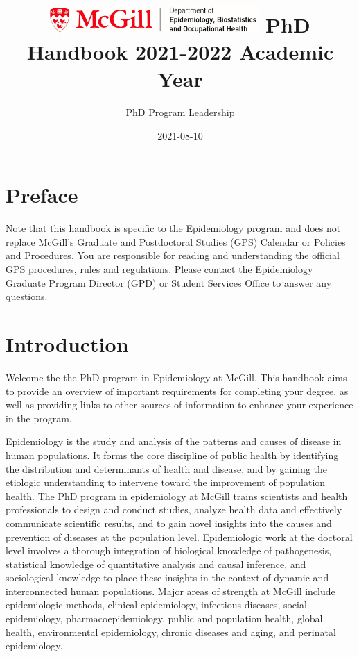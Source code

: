 \documentclass[
]{book}
\title{\includegraphics[width=3.125in,height=\textheight]{mcgill-epi-logo.png} PhD Handbook 2021-2022 Academic Year}
\author{PhD Program Leadership}
\date{2021-08-10}
\begin{document}
\maketitle

{
\setcounter{tocdepth}{1}
\tableofcontents
}
\hypertarget{preface}{%
\chapter*{Preface}\label{preface}}

Note that this handbook is specific to the Epidemiology program and does not replace McGill's Graduate and Postdoctoral Studies (GPS) \href{https://www.mcgill.ca/students/courses/calendars/}{Calendar} or \href{https://www.mcgill.ca/gps/students/policies-and-guidelines}{Policies and Procedures}. You are responsible for reading and understanding the official GPS procedures, rules and regulations. Please contact the Epidemiology Graduate Program Director (GPD) or Student Services Office to answer any questions.

\hypertarget{introduction}{%
\chapter{Introduction}\label{introduction}}

Welcome the the PhD program in Epidemiology at McGill. This handbook aims to provide an overview of important requirements for completing your degree, as well as providing links to other sources of information to enhance your experience in the program.

Epidemiology is the study and analysis of the patterns and causes of disease in human populations. It forms the core discipline of public health by identifying the distribution and determinants of health and disease, and by gaining the etiologic understanding to intervene toward the improvement of population health. The PhD program in epidemiology at McGill trains scientists and health professionals to design and conduct studies, analyze health data and effectively communicate scientific results, and to gain novel insights into the causes and prevention of diseases at the population level. Epidemiologic work at the doctoral level involves a thorough integration of biological knowledge of pathogenesis, statistical knowledge of quantitative analysis and causal inference, and sociological knowledge to place these insights in the context of dynamic and interconnected human populations. Major areas of strength at McGill include epidemiologic methods, clinical epidemiology, infectious diseases, social epidemiology, pharmacoepidemiology, public and population health, global health, environmental epidemiology, chronic diseases and aging, and perinatal epidemiology.
\end{document}
